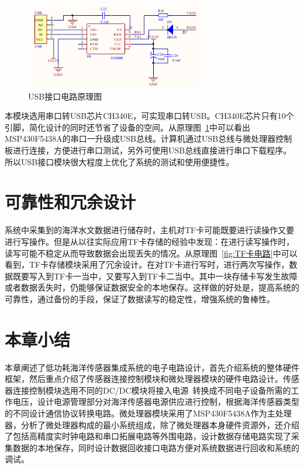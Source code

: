 \begin{figure}[ht]
    \centering
	\includegraphics[width=0.7\textwidth]{fig/usb.png}
	\caption{USB接口电路原理图}
	\label{fig:USB接口模块原理图}
\end{figure}

本模块选用串口转USB芯片CH340E，可实现串口转USB。CH340E芯片只有10个引脚，简化设计的同时还节省了设备的空间。从原理图~\ref{fig:USB接口模块原理图}中可以看出MSP430F5438A的串口一升级成USB总线。计算机通过USB总线与微处理器控制板进行连接，方便进行串口测试，另外可使用USB总线直接进行串口下载程序。所以USB接口模块很大程度上优化了系统的测试和使用便捷性。

\section{可靠性和冗余设计}
系统中采集到的海洋水文数据进行储存时，主机对TF卡可能既要进行读操作又要进行写操作。但是从以往实际应用TF卡存储的经验中发现：在进行读写操作时，读写可能不稳定从而导致数据会出现丢失的情况。从原理图~\ref{fig:TF卡电路}中可以看到，TF卡存储模块采用了冗余设计。在对TF卡进行写时，进行两次写操作，数据既要写入到TF卡一当中，又要写入到TF卡二当中。其中一块存储卡写发生故障或者数据丢失时，仍能够保证数据安全的本地保存。这样做的好处是，提高系统的可靠性，通过备份的手段，保证了数据读写的稳定性，增强系统的鲁棒性。


\section{本章小结}
本章阐述了低功耗海洋传感器集成系统的电子电路设计，首先介绍系统的整体硬件框架，然后重点介绍了传感器连接控制模块和微处理器模块的硬件电路设计。传感器连接控制模块选用不同的DC/DC模块将接入电源~\cite{yzx}转换成不同电子设备所需的工作电压，设计电源管理部分对海洋传感器电源供应进行控制，根据海洋传感器类型的不同设计通信协议转换电路。微处理器模块采用了MSP430F5438A作为主处理器，分析了微处理器构成的最小系统组成，除了微处理器本身硬件资源外，还介绍了包括高精度实时钟电路和串口拓展电路等外围电路，设计数据存储电路实现了采集数据的本地保存，同时设计数据回收接口电路方便对系统数据进行回收和系统的调试。


